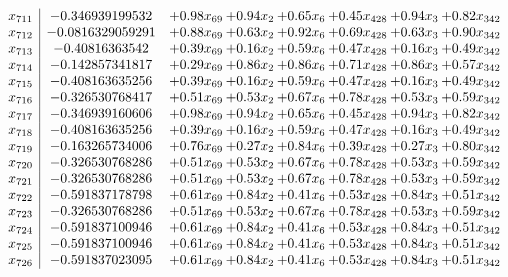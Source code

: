 \documentclass[8pt]{article}
\begin{document}
\[\begin{array}{c| c c@{\hskip 2pt} c@{\hskip 2pt} c@{\hskip 2pt} c@{\hskip 2pt} c@{\hskip 2pt} c@{\hskip 2pt} }
 x_{711}   &  -0.346939199532 & +  0.98 x_{69} & +  0.94 x_{2} & +  0.65 x_{6} & +  0.45 x_{428} & +  0.94 x_{3} & +  0.82 x_{342}\\
 x_{712}   &  -0.0816329059291 & +  0.88 x_{69} & +  0.63 x_{2} & +  0.92 x_{6} & +  0.69 x_{428} & +  0.63 x_{3} & +  0.90 x_{342}\\
 x_{713}   &  -0.40816363542 & +  0.39 x_{69} & +  0.16 x_{2} & +  0.59 x_{6} & +  0.47 x_{428} & +  0.16 x_{3} & +  0.49 x_{342}\\
 x_{714}   &  -0.142857341817 & +  0.29 x_{69} & +  0.86 x_{2} & +  0.86 x_{6} & +  0.71 x_{428} & +  0.86 x_{3} & +  0.57 x_{342}\\
 x_{715}   &  -0.408163635256 & +  0.39 x_{69} & +  0.16 x_{2} & +  0.59 x_{6} & +  0.47 x_{428} & +  0.16 x_{3} & +  0.49 x_{342}\\
 x_{716}   &  -0.326530768417 & +  0.51 x_{69} & +  0.53 x_{2} & +  0.67 x_{6} & +  0.78 x_{428} & +  0.53 x_{3} & +  0.59 x_{342}\\
 x_{717}   &  -0.346939160606 & +  0.98 x_{69} & +  0.94 x_{2} & +  0.65 x_{6} & +  0.45 x_{428} & +  0.94 x_{3} & +  0.82 x_{342}\\
 x_{718}   &  -0.408163635256 & +  0.39 x_{69} & +  0.16 x_{2} & +  0.59 x_{6} & +  0.47 x_{428} & +  0.16 x_{3} & +  0.49 x_{342}\\
 x_{719}   &  -0.163265734006 & +  0.76 x_{69} & +  0.27 x_{2} & +  0.84 x_{6} & +  0.39 x_{428} & +  0.27 x_{3} & +  0.80 x_{342}\\
 x_{720}   &  -0.326530768286 & +  0.51 x_{69} & +  0.53 x_{2} & +  0.67 x_{6} & +  0.78 x_{428} & +  0.53 x_{3} & +  0.59 x_{342}\\
 x_{721}   &  -0.326530768286 & +  0.51 x_{69} & +  0.53 x_{2} & +  0.67 x_{6} & +  0.78 x_{428} & +  0.53 x_{3} & +  0.59 x_{342}\\
 x_{722}   &  -0.591837178798 & +  0.61 x_{69} & +  0.84 x_{2} & +  0.41 x_{6} & +  0.53 x_{428} & +  0.84 x_{3} & +  0.51 x_{342}\\
 x_{723}   &  -0.326530768286 & +  0.51 x_{69} & +  0.53 x_{2} & +  0.67 x_{6} & +  0.78 x_{428} & +  0.53 x_{3} & +  0.59 x_{342}\\
 x_{724}   &  -0.591837100946 & +  0.61 x_{69} & +  0.84 x_{2} & +  0.41 x_{6} & +  0.53 x_{428} & +  0.84 x_{3} & +  0.51 x_{342}\\
 x_{725}   &  -0.591837100946 & +  0.61 x_{69} & +  0.84 x_{2} & +  0.41 x_{6} & +  0.53 x_{428} & +  0.84 x_{3} & +  0.51 x_{342}\\
 x_{726}   &  -0.591837023095 & +  0.61 x_{69} & +  0.84 x_{2} & +  0.41 x_{6} & +  0.53 x_{428} & +  0.84 x_{3} & +  0.51 x_{342}\\

\end{array}\]
\end{document}
